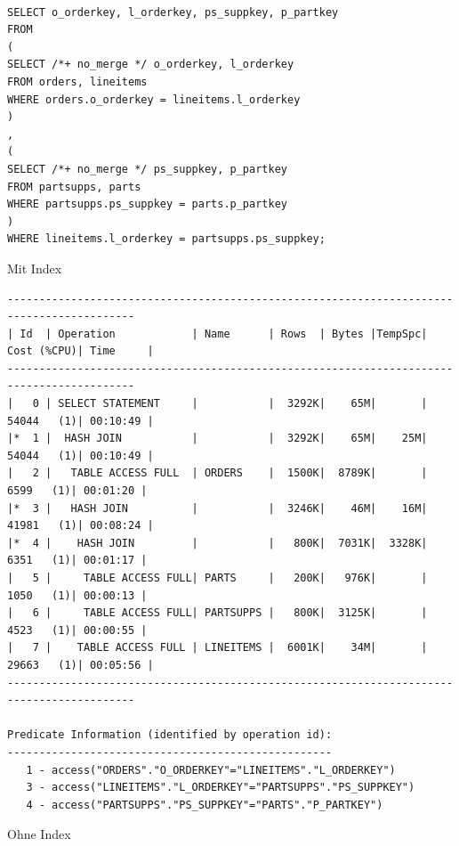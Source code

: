 \documentclass[10pt]{article}
\begin{document}
\begin{lstlisting}[style=sql]

SELECT o_orderkey, l_orderkey, ps_suppkey, p_partkey
FROM
(
SELECT /*+ no_merge */ o_orderkey, l_orderkey
FROM orders, lineitems
WHERE orders.o_orderkey = lineitems.l_orderkey
)
,
(
SELECT /*+ no_merge */ ps_suppkey, p_partkey
FROM partsupps, parts
WHERE partsupps.ps_suppkey = parts.p_partkey
)
WHERE lineitems.l_orderkey = partsupps.ps_suppkey;
\end{lstlisting}
Mit Index
\begin{lstlisting}[style=queryexecutionplan]
------------------------------------------------------------------------------------------
| Id  | Operation            | Name      | Rows  | Bytes |TempSpc| Cost (%CPU)| Time     |
------------------------------------------------------------------------------------------
|   0 | SELECT STATEMENT     |           |  3292K|    65M|       | 54044   (1)| 00:10:49 |
|*  1 |  HASH JOIN           |           |  3292K|    65M|    25M| 54044   (1)| 00:10:49 |
|   2 |   TABLE ACCESS FULL  | ORDERS    |  1500K|  8789K|       |  6599   (1)| 00:01:20 |
|*  3 |   HASH JOIN          |           |  3246K|    46M|    16M| 41981   (1)| 00:08:24 |
|*  4 |    HASH JOIN         |           |   800K|  7031K|  3328K|  6351   (1)| 00:01:17 |
|   5 |     TABLE ACCESS FULL| PARTS     |   200K|   976K|       |  1050   (1)| 00:00:13 |
|   6 |     TABLE ACCESS FULL| PARTSUPPS |   800K|  3125K|       |  4523   (1)| 00:00:55 |
|   7 |    TABLE ACCESS FULL | LINEITEMS |  6001K|    34M|       | 29663   (1)| 00:05:56 |
------------------------------------------------------------------------------------------
 
Predicate Information (identified by operation id):
---------------------------------------------------
   1 - access("ORDERS"."O_ORDERKEY"="LINEITEMS"."L_ORDERKEY")
   3 - access("LINEITEMS"."L_ORDERKEY"="PARTSUPPS"."PS_SUPPKEY")
   4 - access("PARTSUPPS"."PS_SUPPKEY"="PARTS"."P_PARTKEY")
\end{lstlisting}
Ohne Index
\end{document}
